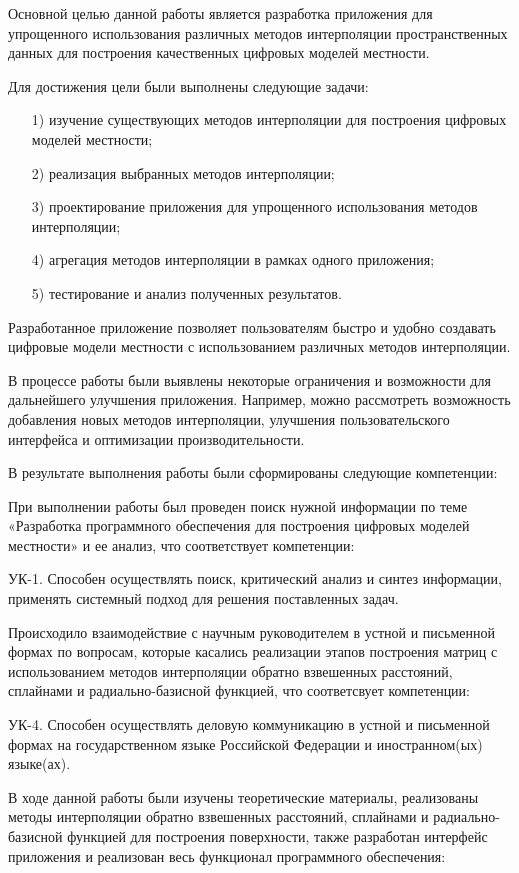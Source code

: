 \conclusion
Основной целью данной работы является разработка приложения для упрощенного использования различных методов интерполяции пространственных данных для построения качественных цифровых моделей местности.

Для достижения цели были выполнены следующие задачи:
\begin{enumerate}
    \item [1)] изучение существующих методов интерполяции для построения цифровых моделей местности;
    \item [2)] реализация выбранных методов интерполяции;
    \item [3)] проектирование приложения для упрощенного использования методов интерполяции;
    \item [4)] агрегация методов интерполяции в рамках одного приложения;
    \item [5)] тестирование и анализ полученных результатов.
\end{enumerate}

Разработанное приложение позволяет пользователям быстро и удобно создавать цифровые модели местности с использованием различных методов интерполяции.

В процессе работы были выявлены некоторые ограничения и возможности для дальнейшего улучшения приложения. Например, можно рассмотреть возможность добавления новых методов интерполяции, улучшения пользовательского интерфейса и оптимизации производительности.

В результате выполнения работы были сформированы следующие компетенции:

При выполнении работы был проведен поиск нужной информации по теме «Разработка программного обеспечения для построения цифровых моделей местности» и ее анализ, что соответствует компетенции:

УК-1. Способен осуществлять поиск, критический анализ и синтез информации, применять системный подход для решения поставленных задач.

Происходило взаимодействие с научным руководителем в устной и письменной формах по вопросам, которые касались реализации этапов построения матриц с использованием методов интерполяции обратно взвешенных расстояний, сплайнами и радиально-базисной функцией, что соответсвует компетенции:

УК-4. Способен осуществлять деловую коммуникацию в устной и письменной формах на государственном языке Российской Федерации и иностранном(ых) языке(ах).

В ходе данной работы были изучены теоретические материалы, реализованы методы интерполяции обратно взвешенных расстояний, сплайнами и радиально-базисной функцией для построения поверхности, также разработан интерфейс приложения и реализован весь функционал программного обеспечения:


